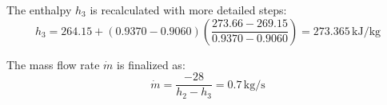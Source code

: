The enthalpy \( h_3 \) is recalculated with more detailed steps:  
\[
h_3 = 264.15 + (0.9370 - 0.9060) \left( \frac{273.66 - 269.15}{0.9370 - 0.9060} \right) = 273.365 \, \text{kJ/kg}
\]  

The mass flow rate \( \dot{m} \) is finalized as:  
\[
\dot{m} = \frac{-28}{h_2 - h_3} = 0.7 \, \text{kg/s}
\]